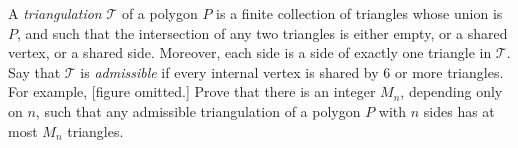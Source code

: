 A \emph{triangulation} $\mathcal{T}$ of a polygon $P$ is a finite
collection of triangles whose union is $P$, and such that the
intersection of any two triangles is either empty, or a shared vertex,
or a shared side. Moreover, each side is a side of exactly one triangle
in $\mathcal{T}$. Say that $\mathcal{T}$ is \emph{admissible} if every
internal vertex is shared by 6 or more triangles. For example, [figure
omitted.] Prove that there is an integer $M_n$, depending only on $n$,
such that any admissible triangulation of a polygon $P$ with $n$ sides
has at most $M_n$ triangles.
